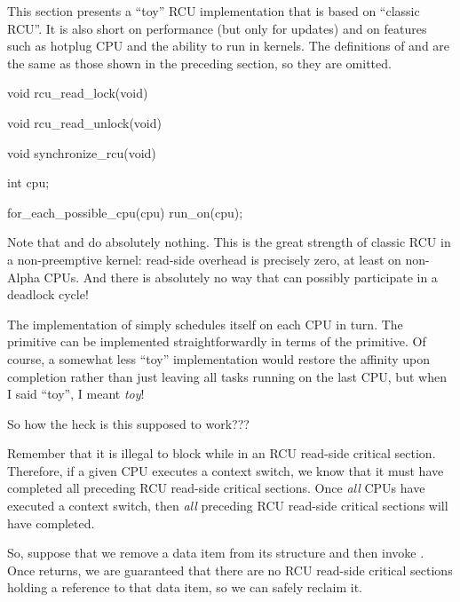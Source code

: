 This section presents a ``toy'' RCU implementation that is based on
``classic RCU\@''.
It is also short on performance (but only for updates) and
on features such as hotplug CPU and the ability to run in 
kernels.
The definitions of  and 
are the same as those shown in the preceding section, so they are omitted.

\begin{VerbatimU}
	void rcu_read_lock(void) { }

	void rcu_read_unlock(void) { }

	void synchronize_rcu(void)
	{
		int cpu;

		for_each_possible_cpu(cpu)
			run_on(cpu);
	}
\end{VerbatimU}

Note that  and  do absolutely nothing.
This is the great strength of classic RCU in a non-preemptive kernel:
read-side overhead is precisely zero, at least on non-Alpha CPUs.
And there is absolutely no way that  can possibly
participate in a deadlock cycle!

The implementation of  simply schedules itself on each
CPU in turn.
The  primitive can be implemented straightforwardly
in terms of the  primitive.
Of course, a somewhat less
``toy'' implementation would restore the affinity upon completion rather
than just leaving all tasks running on the last CPU, but when I said
``toy'', I meant \emph{toy}!

So how the heck is this supposed to work???

Remember that it is illegal to block while in an RCU read-side critical
section.
Therefore, if a given CPU executes a context switch, we know
that it must have completed all preceding RCU read-side critical sections.
Once \emph{all} CPUs have executed a context switch, then \emph{all} preceding
RCU read-side critical sections will have completed.

So, suppose that we remove a data item from its structure and then invoke
.  Once  returns, we are guaranteed
that there are no RCU read-side critical sections holding a reference
to that data item, so we can safely reclaim it.

